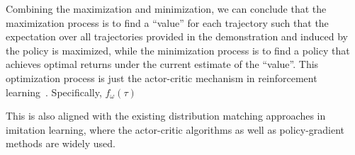% 
% 
% 

Combining the maximization and minimization,
we can conclude that the maximization process is to find a ``value'' for each trajectory such that the expectation over all trajectories provided in the demonstration and induced by the policy is maximized, 
while the minimization process is to find a policy that achieves optimal returns under the current estimate of the ``value''. 
This optimization process is just the actor-critic mechanism in reinforcement learning~\citep{konda2000actor}.
Specifically, $f_{\omega}(\tau)$ 



This is also aligned with the existing distribution matching approaches in imitation learning, where the actor-critic algorithms as well as policy-gradient methods are widely used. 

